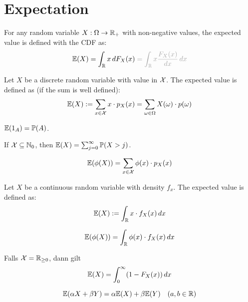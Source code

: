 \section{Expectation}

For any random variable \(X: \Omega \to \mathbb{R}_+\) with non-negative values, the expected value is defined with the CDF as:
\[\E(X) = \int_\R x \,dF_X(x) \color{gray!70} = \int_\R x \frac{F_X(x)}{dx} \, dx\]

\begin{ddefinition*}
  Let \(X\) be a discrete random variable with value in \(\operatorname{\mathcal{X}}\). The expected value is defined as (if the sum is well defined):
  \[\mathbb{E}(X) := \sum_{x \in \operatorname{\mathcal{X}}}x \cdot p_X(x) = \sum_{\omega \in \Omega} X(\omega) \cdot p(\omega)\]
\end{ddefinition*}

\begin{proposition}
  {\small \(\mathbb{E}(1_A) = \mathbb{P}(A)\)}.
\end{proposition}

\begin{proposition}
  If \(\operatorname{\mathcal{X}} \subseteq \mathbb{N}_0\), then \(\mathbb{E}(X) = \sum_{j=0}^\infty \mathbb{P}(X > j)\).
\end{proposition}

\begin{dtheorem*} \vspace{-5pt}
  \[\mathbb{E}(\phi(X)) = \sum_{x \in \operatorname{\mathcal{X}}}\phi(x) \cdot p_X(x)\]
\end{dtheorem*}

\begin{cdefinition*}
  Let \(X\) be a continuous random variable with density \(f_x\). The expected value is defined as:
  \[\mathbb{E}(X) := \int_{\mathbb{R}} x \cdot f_X(x) \,dx\]
\end{cdefinition*}

\begin{ctheorem*}[LOTUS] \vspace{-5pt}
  \[\mathbb{E}(\phi(X)) = \int_{\mathbb{R}} \phi(x) \cdot f_X(x) \, dx\]
\end{ctheorem*}

\begin{proposition}
  Falls \(\operatorname{\mathcal{X}} = \mathbb{R}_{\geq 0}\), dann gilt
  \[\mathbb{E}(X) = \int_0^\infty (1- F_X(x)) \, dx\]
\end{proposition}

\begin{theorem*} \vspace{-5pt}
  \[\mathbb{E}(\alpha X + \beta Y) = \alpha \mathbb{E}(X) + \beta \mathbb{E}(Y) \quad (a, b \in \mathbb{R})\]
\end{theorem*}

